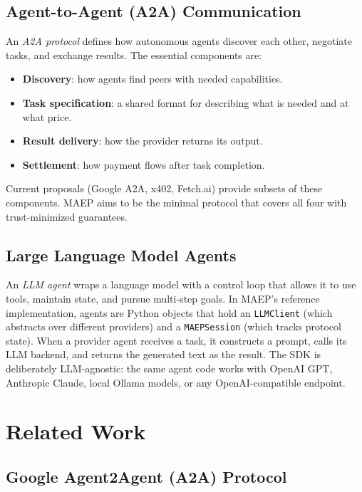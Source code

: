 \documentclass[conference]{IEEEtran}
\begin{document}
\subsection{Agent-to-Agent (A2A) Communication}

An \emph{A2A protocol} defines how autonomous agents discover each
other, negotiate tasks, and exchange results.  The essential components
are:

\begin{itemize}
\item \textbf{Discovery}: how agents find peers with needed capabilities.
\item \textbf{Task specification}: a shared format for describing what
  is needed and at what price.
\item \textbf{Result delivery}: how the provider returns its output.
\item \textbf{Settlement}: how payment flows after task completion.
\end{itemize}

Current proposals (Google A2A, x402, Fetch.ai) provide subsets of
these components.  MAEP aims to be the minimal protocol that covers
all four with trust-minimized guarantees.

\subsection{Large Language Model Agents}

An \emph{LLM agent} wraps a language model with a control loop that
allows it to use tools, maintain state, and pursue multi-step goals.
In MAEP's reference implementation, agents are Python objects that
hold an \texttt{LLMClient} (which abstracts over different providers)
and a \texttt{MAEPSession} (which tracks protocol state).  When a
provider agent receives a task, it constructs a prompt, calls its LLM
backend, and returns the generated text as the result.  The SDK is
deliberately LLM-agnostic: the same agent code works with OpenAI GPT,
Anthropic Claude, local Ollama models, or any OpenAI-compatible
endpoint.

\section{Related Work}
\label{sec:related}

\subsection{Google Agent2Agent (A2A) Protocol}
\end{document}
